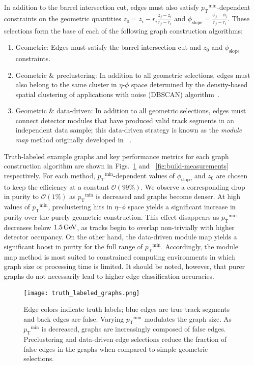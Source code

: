 \documentclass[twocolumn]{svjour3}
\newcommand{\pt}{\ensuremath{p_{\mathrm{T}}}\xspace}
\newcommand{\GeV}{\ensuremath{\,\text{Ge\hspace{-.08em}V}}\xspace}
\begin{document}
In addition to the barrel intersection cut, edges must also satisfy $\pt^\mathrm{min}$-dependent constraints on the geometric quantities $z_0=z_i-r_i\frac{z_j-z_i}{r_j-r_i}$ and $\phi_\mathrm{slope}=\frac{\phi_j-\phi_i}{r_j-r_i}$. 
These selections form the base of each of the following graph construction algorithms: 

\begin{enumerate} 
\item Geometric: Edges must satisfy the barrel intersection cut and $z_0$ and $\phi_\mathrm{slope}$ constraints. 
\item Geometric \& preclustering: In addition to all geometric selections, edges must also belong to the same cluster in $\eta$-$\phi$ space determined by the density-based spatial clustering of applications with noise (DBSCAN) algorithm~\cite{dbscan}. 
\item Geometric \& data-driven: In addition to all geometric selections, edges must connect detector modules that have produced valid track segments in an independent data sample; this data-driven strategy is known as the \textit{module map} method originally developed in ~\cite{Biscarat:2021dlj}. 
\end{enumerate}

Truth-labeled example graphs and key performance metrics for each graph construction algorithm are shown in Figs.~\ref{fig:construction} and ~\ref{fig:build-measurements} respectively. 
For each method, $\pt^\mathrm{min}$-dependent values of $\phi_\mathrm{slope}$ and $z_0$ are chosen to keep the efficiency at a constant $\mathcal{O}(99\%)$. 
We observe a corresponding drop in purity to $\mathcal{O}(1\%)$ as $\pt^\mathrm{min}$ is decreased and graphs become denser. 
At high values of $\pt^\mathrm{min}$, preclustering hits in $\eta$--$\phi$ space yields a significant increase in purity over the purely geometric construction. 
This effect disappears as $\pt^\mathrm{min}$ decreases below $1.5\GeV$, as tracks begin to overlap non-trivially with higher detector occupancy. 
On the other hand, the data-driven module map yields a significant boost in purity for the full range of $\pt^\mathrm{min}$. 
Accordingly, the module map method is most suited to constrained computing environments in which graph size or processing time is limited. 
It should be noted, however, that purer graphs do not necessarily lead to higher edge classification accuracies. 

\begin{figure}[!htbp]
\centering
\texttt{[image: truth\_labeled\_graphs.png]}
\caption{Edge colors indicate truth labels; blue edges are true track segments and back edges are false. 
Varying $\pt^\mathrm{min}$ modulates the graph size. 
As $\pt^\mathrm{min}$ is decreased, graphs are increasingly composed of false edges. 
Preclustering and data-driven edge selections reduce the fraction of false edges in the graphs when compared to simple geometric selections. }
\label{fig:construction} 
\end{figure}
\end{document}
